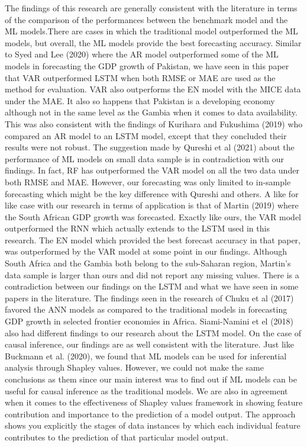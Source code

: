 \documentclass[12pt,italian, twoside]{report}
\begin{document}
The findings of this research are generally consistent with the literature in terms of the comparison of the performances between the benchmark model and the ML models.There are cases in which the traditional model outperformed the ML models, but overall, the ML models provide the best forecasting accuracy. Similar to Syed and Lee (2020) where the AR model outperformed some of the ML models in forecasting the GDP growth of Pakistan, we have seen in this paper that VAR outperformed LSTM when both RMSE or MAE are used as the method for evaluation. VAR also outperforms the EN model with the MICE data under the MAE. It also so happens that Pakistan is a developing economy although not in the same level as the Gambia when it comes to data availability. This was also consistent with the findings of Kurihara and Fukushima (2019) who compared an AR model to an LSTM model, except that they concluded their results were not robust. The suggestion made by Qureshi et al (2021) about the performance of ML models on small data sample is in contradiction with our findings. In fact, RF has outperformed the VAR model on all the two data under both RMSE and MAE. However, our forecasting was only limited to in-sample forecasting which might be the key difference with Qureshi and others. A like for like case with our research in terms of application is that of Martin (2019) where the South African GDP growth was forecasted. Exactly like ours, the VAR model outperformed the RNN which actually extends to the LSTM used in this research. The EN model which provided the best forecast accuracy in that paper, was outperformed by the VAR model at some point in our findings. Although South Africa and the Gambia both belong to the sub-Saharan region, Martin’s data sample is larger than ours and did not report any missing values. There is a contradiction between our findings on the LSTM and what we have seen in some papers in the literature. The findings seen in the research of Chuku et al (2017) favored the ANN models as compared to the traditional models in forecasting GDP growth in selected frontier economies in Africa. Siami-Namini et el (2018) also had different findings to our research about the LSTM model. On the case of causal inference, our findings are as well consistent with the literature. Just like Buckmann et al. (2020), we found that ML models can be used for inferential analysis through Shapley values. However, we could not make the same conclusions as them since our main interest was to find out if ML models can be useful for causal inference as the traditional models. We are also in agreement when it comes to the effectiveness of Shapley values framework in showing feature contribution and importance to the prediction of a model output. The approach shows you explicitly the stages of data instances by which each individual feature contributes to the prediction of that particular model output.
\end{document}
